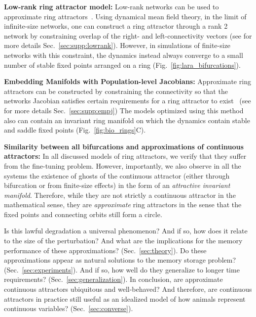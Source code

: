 \documentclass{article} %
\newcommand{\ptitle}[1]{\textbf{#1:}\xspace}
\newcounter{ct}
\theoremstyle{definition}
\theoremstyle{remark}
\begin{document}
\ptitle{Low-rank ring attractor model} %
Low-rank networks can be used to approximate ring attractors~\citep{mastrogiuseppe2018, beiran2021}.
Using dynamical mean field theory, in the limit of infinite-size networks, one can construct a ring attractor through a rank 2 network by constraining overlap of the right- and left-connectivity vectors (see for more details  Sec.~\ref{sec:supp:lowrank}).
However, in simulations of finite-size networks with this constraint, the dynamics instead always converge to a small number of stable fixed points arranged on a ring (Fig.~\ref{fig:lara_bifurcations}).

\ptitle{Embedding Manifolds with Population-level Jacobians} %
Approximate ring attractors can be constructed by constraining the connectivity so that the networks Jacobian satisfies certain requirements for a ring attractor to exist~\citep{pollock2020} (see for more details Sec.~\ref{sec:supp:empj})
The models optimized using this method also can contain an invariant ring manifold on which the dynamics contain stable and saddle fixed points (Fig.~\ref{fig:bio_rings}C).

\ptitle{Similarity between all bifurcations and approximations of continuous attractors}
In all discussed models of ring attractors, we verify that they suffer from the fine-tuning problem.
However, importantly, we also observe in all the systems  the existence of ghosts of the continuous attractor (either through bifurcation or from finite-size effects) in the form of an \emph{attractive invariant manifold}.
Therefore, while they are not strictly a continuous attractor in the mathematical sense, they are \textit{approximate} ring attractors in the sense that the fixed points and connecting orbits still form a circle. 

Is this lawful degradation a universal phenomenon?
 And if so, how does it relate to the size of the perturbation? And what are the implications for the memory performance of these approximations? (Sec.~\ref{sec:theory}).
Do these approximations appear as natural solutions to the memory storage problem? (Sec.~\ref{sec:experiments}).
 And if so, how well do they generalize to longer time requirements? (Sec.~\ref{sec:generalization}).
In conclusion, are approximate continuous attractors ubiquitous and well-behaved? 
 And therefore, are continuous attractors in practice still useful as an idealized model of how animals represent continuous variables? (Sec.~\ref{sec:converse}).

\end{document}
